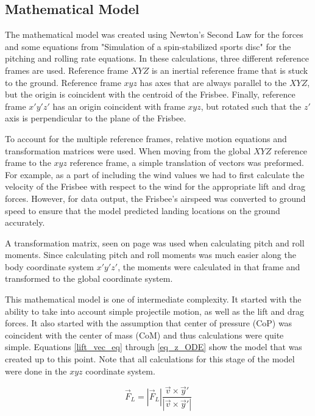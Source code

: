 \documentclass[12pt,twoside,letterpaper]{article}
\begin{document}
\begin{multicols}{2}
\section{Mathematical Model}\label{mathModel}
The mathematical model was created using Newton's Second Law for the forces and some equations from "Simulation of a spin-stabilized sports disc" \cite{Crowther2007} for the pitching and rolling rate equations. In these calculations, three different reference frames are used. Reference frame $XYZ$ is an inertial reference frame that is stuck to the ground. Reference frame $xyz$ has axes that are always parallel to the $XYZ$, but the origin is coincident with the centroid of the Frisbee. Finally, reference frame $x'y'z'$ has an origin coincident with frame $xyz$, but rotated such that the $z'$ axis is perpendicular to the plane of the Frisbee.
\par
To account for the multiple reference frames, relative motion equations and transformation matrices were used. When moving from the global $XYZ$ reference frame to the $xyz$ reference frame, a simple translation of vectors was preformed. For example, as a part of including the wind values we had to first calculate the velocity of the Frisbee with respect to the wind for the appropriate lift and drag forces. However, for data output, the Frisbee's airspeed was converted to ground speed to ensure that the model predicted landing locations on the ground accurately. 
\par
A transformation matrix, seen on page \pageref{mathematicalDev} was used when calculating pitch and roll moments. Since calculating pitch and roll moments was much easier along the body coordinate system $x'y'z'$, the moments were calculated in that frame and transformed to the global coordinate system.
\par
This mathematical model is one of intermediate complexity. It started with the ability to take into account simple projectile motion, as well as the lift and drag forces. It also started with the assumption that center of pressure (CoP) was coincident with the center of mass (CoM) and thus calculations were quite simple. Equations \eqref{lift_vec_eq} through \eqref{eq_z_ODE} show the model that was created up to this point. Note that all calculations for this stage of the model were done in the $xyz$ coordinate system.

\begin{equation}
\vec{F}_L = \left|\vec{F}_L\right|\frac{\vec{v} \times \vec{y}'}{\left|\vec{v} \times \vec{y}'\right|} 
\label{lift_vec_eq}
\end{equation}


\end{multicols}
\end{document}
